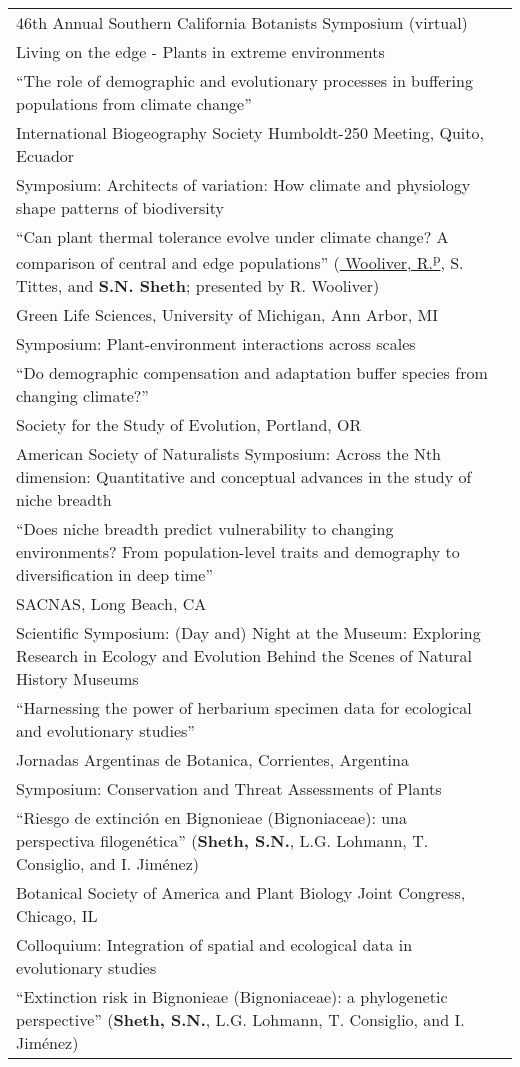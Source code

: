 \documentclass[11pt,english]{article}\usepackage[]{graphicx}\usepackage[]{xcolor}
\providecommand{\tabularnewline}{\\}
\begin{document}
\renewcommand{\arraystretch}{1.2}
\begin{tabularx}{\textwidth}{@{}>{\raggedright}p{5.25in} >{\raggedleft}X@{}}

46th Annual Southern California Botanists Symposium (virtual) & 2020 \tabularnewline
\addtolength{\leftskip}{5ex} Living on the edge - Plants in extreme environments \tabularnewline
\addtolength{\leftskip}{5ex} ``The role of demographic and evolutionary processes in buffering populations from climate change''
\tabularnewline

International Biogeography Society Humboldt-250 Meeting, Quito, Ecuador & 2019 \tabularnewline
\addtolength{\leftskip}{5ex} Symposium: Architects of variation: How climate and physiology shape patterns of biodiversity  \tabularnewline
\addtolength{\leftskip}{5ex} ``Can plant thermal tolerance evolve under climate change? A comparison of central and edge populations'' (\underline{ Wooliver, R.\textsuperscript{p}}, S. Tittes, and \textbf{S.N. Sheth}; presented by R. Wooliver)
\tabularnewline

Green Life Sciences, University of Michigan, Ann Arbor, MI & 2018 \tabularnewline
\addtolength{\leftskip}{5ex} Symposium: Plant-environment interactions across scales  \tabularnewline
\addtolength{\leftskip}{5ex} ``Do demographic compensation and adaptation buffer species from changing climate?'' \tabularnewline

Society for the Study of Evolution, Portland, OR & 2017 \tabularnewline
\addtolength{\leftskip}{5ex} American Society of Naturalists Symposium: Across the Nth dimension: Quantitative and conceptual advances in the study of niche breadth  \tabularnewline
\addtolength{\leftskip}{5ex} ``Does niche breadth predict vulnerability to changing environments? From population-level traits and demography to diversification in deep time'' \tabularnewline

SACNAS, Long Beach, CA & 2016 \tabularnewline
\addtolength{\leftskip}{5ex} Scientific Symposium: (Day and) Night at the Museum: Exploring Research in Ecology and Evolution Behind the Scenes of Natural History Museums \tabularnewline
\addtolength{\leftskip}{5ex} ``Harnessing the power of herbarium specimen data for ecological and evolutionary studies'' \tabularnewline

Jornadas Argentinas de Botanica, Corrientes, Argentina & 2007 \tabularnewline
\addtolength{\leftskip}{5ex} Symposium: Conservation and Threat Assessments of Plants \tabularnewline
\addtolength{\leftskip}{5ex} ``Riesgo de extinci\'on en Bignonieae (Bignoniaceae): una perspectiva filogen\'etica'' (\textbf{Sheth, S.N.}, L.G. Lohmann, T. Consiglio, and I. Jim\'enez) \tabularnewline

Botanical Society of America and Plant Biology Joint Congress, Chicago, IL & 2007 \tabularnewline
\addtolength{\leftskip}{5ex} \small{Colloquium: Integration of spatial and ecological data in evolutionary studies} \tabularnewline
\addtolength{\leftskip}{5ex} ``Extinction risk in Bignonieae (Bignoniaceae): a phylogenetic perspective'' (\textbf{Sheth, S.N.}, L.G. Lohmann, T. Consiglio, and I. Jim\'enez) \tabularnewline

\end{tabularx}
\vspace{-0.5ex}
\end{document}

